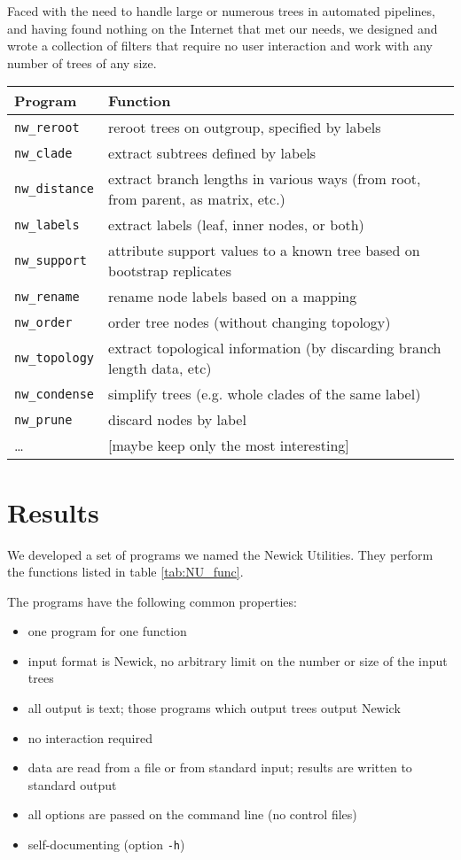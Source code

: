 \documentclass[a4paper,11pt]{article}
\newcommand{\prog}[1]{\texttt{nw\_#1}}
\begin{document}
Faced with the need to handle large or numerous trees in automated pipelines, and having found nothing on the Internet that met our needs, we designed and wrote
a collection of filters that require no user interaction and work with any number of trees of any size. 

\begin{table*}
\begin{tabular}{lp{}}
Program & Function \\ 
\hline 
\prog{reroot} & reroot trees on outgroup, specified by labels \\
\prog{clade} & extract subtrees defined by labels \\
\prog{distance} & extract branch lengths in various ways (from root, from parent, as matrix, etc.) \\
\prog{labels} & extract labels (leaf, inner nodes, or both) \\
\prog{support} & attribute support values to a known tree based on bootstrap replicates \\
\prog{rename} & rename node labels based on a mapping \\
\prog{order} & order tree nodes (without changing topology) \\
\prog{topology} & extract topological information (by discarding branch length data, etc) \\
\prog{condense} & simplify trees (e.g. whole clades of the same label) \\
\prog{prune} & discard nodes by label \\
 \ldots & [maybe keep only the most interesting] \\
\hline
\end{tabular}
\caption{Selected programs from the Newick Utilities}
\label{tab:NU_func}
\end{table*}



\section*{Results}

We developed a set of programs we named the Newick Utilities. They perform the functions listed in table \ref{tab:NU_func}.

The programs have the following common properties:

\begin{itemize}
 \item one program for one function
 \item input format is Newick, no arbitrary limit on the number or size of the input trees
 \item all output is text; those programs which output trees output Newick
 \item no interaction required
 \item data are read from a file or from standard input; results are written to standard output
 \item all options are passed on the command line (no control files)
 \item self-documenting (option \texttt{-h})
\end{itemize}
\end{document}
